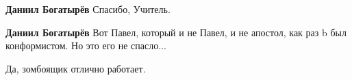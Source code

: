 \begin{itemize}
\begin{itemize}
 
\textbf{Даниил Богатырёв} Спасибо, Учитель.

 
\textbf{Даниил Богатырёв} Вот Павел, который и не Павел, и не апостол, как раз b был конформистом. Но это его не спасло...
\end{itemize}

 
Да, зомбоящик отлично работает.


\end{itemize}

